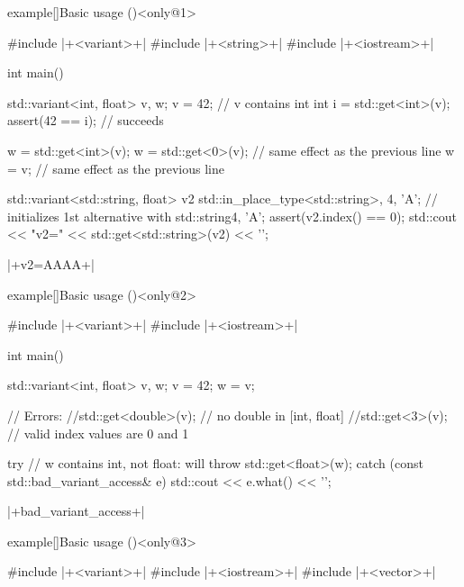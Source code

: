 \begin{frame}[fragile]{}
    \begin{varblock}{example}[\textwidth]{Basic usage (\overlaynumber)}<only@1>
        \begin{Cpp}
            #include |+<variant>+|
            #include |+<string>+|
            #include |+<iostream>+|

            int main()
            {
                std::variant<int, float> v, w;
                v = 42; // v contains int
                int i = std::get<int>(v);
                assert(42 == i); // succeeds

                w = std::get<int>(v);
                w = std::get<0>(v); // same effect as the previous line
                w = v;              // same effect as the previous line

                std::variant<std::string, float> v2{
                    std::in_place_type<std::string>, 4, 'A'};
                // initializes 1st alternative with std::string{4, 'A'};
                assert(v2.index() == 0);
                std::cout << "v2=" << std::get<std::string>(v2) << '\n';
            }
        \end{Cpp}
        \begin{Bash}[numbers=none]
            |+v2=AAAA+|
        \end{Bash}
    \end{varblock}
    \begin{varblock}{example}[\textwidth]{Basic usage (\overlaynumber)}<only@2>
        \begin{Cpp}
            #include |+<variant>+|
            #include |+<iostream>+|

            int main()
            {
                std::variant<int, float> v, w;
                v = 42;
                w = v;

                // Errors:
                //std::get<double>(v); // no double in [int, float]
                //std::get<3>(v);      // valid index values are 0 and 1

                try {
                    // w contains int, not float: will throw
                    std::get<float>(w);
                }
                catch (const std::bad_variant_access& e) {
                    std::cout << e.what() << '\n';
                }
            }
        \end{Cpp}
        \begin{Bash}[numbers=none]
            |+bad_variant_access+|
        \end{Bash}
    \end{varblock}
    \begin{varblock}{example}[\textwidth]{Basic usage (\overlaynumber)}<only@3>
        \begin{Cpp}
            #include |+<variant>+|
            #include |+<iostream>+|
            #include |+<vector>+|


\end{Cpp}
\end{varblock}
\end{frame}

